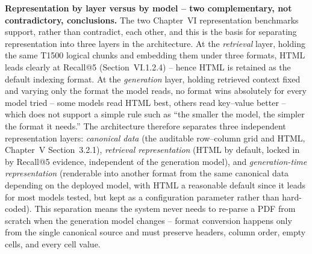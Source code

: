 \documentclass[11pt,a4paper]{article}
\begin{document}
\textbf{Representation by layer versus by model -- two complementary, not
contradictory, conclusions.} The two Chapter~VI representation benchmarks
support, rather than contradict, each other, and this is the basis for
separating representation into three layers in the architecture. At the
\emph{retrieval} layer, holding the same T1500 logical chunks and embedding
them under three formats, HTML leads clearly at Recall@5
(Section~VI.1.2.4) -- hence HTML is retained as the default indexing
format. At the \emph{generation} layer, holding retrieved context fixed and
varying only the format the model reads, no format wins absolutely for
every model tried -- some models read HTML best, others read key--value
better -- which does not support a simple rule such as ``the smaller the
model, the simpler the format it needs.'' The architecture therefore
separates three independent representation layers: \emph{canonical data}
(the auditable row--column grid and HTML, Chapter~V Section~3.2.1),
\emph{retrieval representation} (HTML by default, locked in by Recall@5
evidence, independent of the generation model), and \emph{generation-time
representation} (renderable into another format from the same canonical
data depending on the deployed model, with HTML a reasonable default since
it leads for most models tested, but kept as a configuration parameter
rather than hard-coded). This separation means the system never needs to
re-parse a PDF from scratch when the generation model changes -- format
conversion happens only from the single canonical source and must preserve
headers, column order, empty cells, and every cell value.
\end{document}
